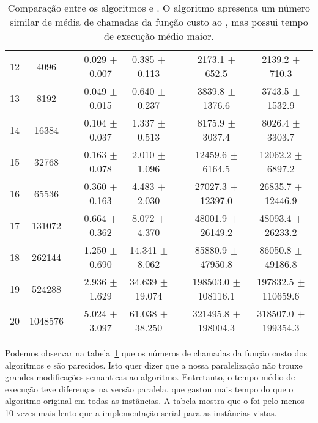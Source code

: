 \begin{table}
\begin{tabular}{cc c cc c cc}
12 &    4096 && 0.029 $\pm$ 0.007 & 0.385 $\pm$ 0.113 && 2173.1 $\pm$ 652.5 & 2139.2 $\pm$ 710.3 \\
13 &    8192 && 0.049 $\pm$ 0.015 & 0.640 $\pm$ 0.237 && 3839.8 $\pm$ 1376.6 & 3743.5 $\pm$ 1532.9 \\
14 &   16384 && 0.104 $\pm$ 0.037 & 1.337 $\pm$ 0.513 && 8175.9 $\pm$ 3037.4 & 8026.4 $\pm$ 3303.7 \\
15 &   32768 && 0.163 $\pm$ 0.078 & 2.010 $\pm$ 1.096 && 12459.6 $\pm$ 6164.5 & 12062.2 $\pm$ 6897.2 \\
16 &   65536 && 0.360 $\pm$ 0.163 & 4.483 $\pm$ 2.030 && 27027.3 $\pm$ 12397.0 & 26835.7 $\pm$ 12446.9 \\
17 &  131072 && 0.664 $\pm$ 0.362 & 8.072 $\pm$ 4.370 && 48001.9 $\pm$ 26149.2 & 48093.4 $\pm$ 26233.2 \\
18 &  262144 && 1.250 $\pm$ 0.690 & 14.341 $\pm$ 8.062 && 85880.9 $\pm$ 47950.8 & 86050.8 $\pm$ 49186.8 \\
19 &  524288 && 2.936 $\pm$ 1.629 & 34.639 $\pm$ 19.074 && 198503.0 $\pm$ 108116.1 & 197832.5 $\pm$ 110659.6 \\
20 & 1048576 && 5.024 $\pm$ 3.097 & 61.038 $\pm$ 38.250 && 321495.8 $\pm$ 198004.3 & 318507.0 $\pm$ 199354.3 \\
\end{tabular}
\caption{Comparação entre os algoritmos  e .
O algoritmo  apresenta um número similar de média de 
chamadas da função custo ao , mas possui tempo de execução 
médio maior.}
\label{tab:ppfs_vs_pfs}
\end{table}

Podemos observar na tabela~\ref{tab:ppfs_vs_pfs} que os números de 
chamadas da função custo dos algoritmos  e 
são parecidos. Isto quer dizer que a nossa paralelização não trouxe 
grandes modificações semanticas ao algoritmo. Entretanto, o tempo médio
de execução teve diferenças na versão paralela, que gastou mais tempo
do que o algoritmo original em todas as instâncias. A tabela mostra
que o  foi pelo menos 10 vezes mais lento que a 
implementação serial para as instâncias vistas.


